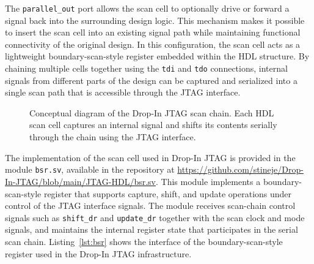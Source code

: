 \documentclass[10pt]{article}
\begin{document}
The \texttt{parallel\_out} port allows the scan cell to optionally drive or forward a signal back into the surrounding design logic. This mechanism makes it possible to insert the scan cell into an existing signal path while maintaining functional connectivity of the original design. In this configuration, the scan cell acts as a lightweight boundary-scan-style register embedded within the HDL structure. By chaining multiple cells together using the \texttt{tdi} and \texttt{tdo} connections, internal signals from different parts of the design can be captured and serialized into a single scan path that is accessible through the JTAG interface.
\begin{figure}[h]
\centering
{}
\caption{Conceptual diagram of the Drop-In JTAG scan chain. Each HDL scan cell captures an internal signal and shifts its contents serially through the chain using the JTAG interface.}
\label{fig:scan_chain}
\end{figure}

The implementation of the scan cell used in Drop-In JTAG is provided in the module \texttt{bsr.sv}, available in the repository at \url{https://github.com/stineje/Drop-In-JTAG/blob/main/JTAG-HDL/bsr.sv}. This module implements a boundary-scan-style register that supports capture, shift, and update operations under control of the JTAG interface signals. The module receives scan-chain control signals such as \texttt{shift\_dr} and \texttt{update\_dr} together with the scan clock and mode signals, and maintains the internal register state that participates in the serial scan chain. Listing~\ref{lst:bsr} shows the interface of the boundary-scan-style register used in the Drop-In JTAG infrastructure.
\end{document}
